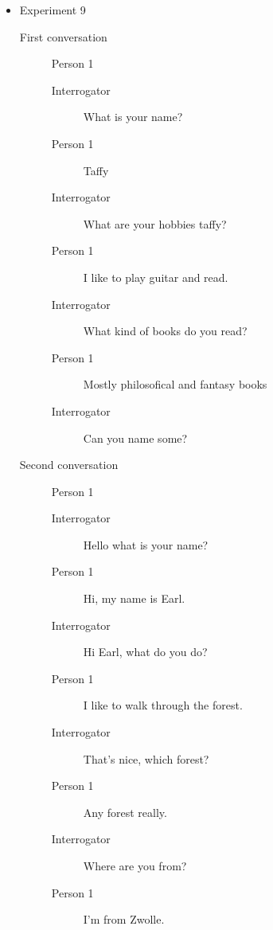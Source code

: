 \begin{itemize}
   \item Experiment 9
      \begin{description}
         \item [First conversation] Person 1
            \begin{description}
               \item [Interrogator] What is your name?
               \item [Person 1] Taffy
               \item [Interrogator] What are your hobbies taffy?
               \item [Person 1] I like to play guitar and read.
               \item [Interrogator] What kind of books do you read?
               \item [Person 1] Mostly philosofical and fantasy books
               \item [Interrogator] Can you name some?
            \end{description}
         \item [Second conversation] Person 1
            \begin{description}
               \item [Interrogator] Hello what is your name?
               \item [Person 1] Hi, my name is Earl.
               \item [Interrogator] Hi Earl, what do you do?
               \item [Person 1] I like to walk through the forest.
               \item [Interrogator] That's nice, which forest?
               \item [Person 1] Any forest really.
               \item [Interrogator] Where are you from?
               \item [Person 1] I'm from Zwolle.
            \end{description}
      \end{description}


\end{itemize}
